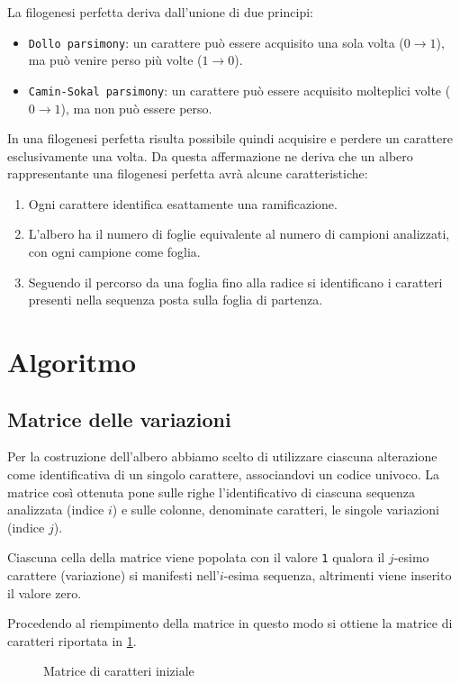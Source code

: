 \documentclass[11pt,italian]{article}
\begin{document}
\noindent
La filogenesi perfetta deriva dall'unione di due principi:
\begin{itemize}
	\item \lstinline{Dollo parsimony}: un carattere può essere acquisito una sola volta ($0 \to 1$), ma può venire perso più volte ($1 \to 0$).
	\item \lstinline{Camin-Sokal parsimony}: un carattere può essere acquisito molteplici volte ($0 \to 1$), ma non può essere perso.
\end{itemize}
In una filogenesi perfetta risulta possibile quindi acquisire e perdere un carattere esclusivamente una volta.
Da questa affermazione ne deriva che un albero rappresentante una filogenesi perfetta avrà alcune caratteristiche:
\begin{enumerate}
	\item Ogni carattere identifica esattamente una ramificazione.
	\item L'albero ha il numero di foglie equivalente al numero di campioni analizzati, con ogni campione come foglia.
	\item Seguendo il percorso da una foglia fino alla radice si identificano i caratteri presenti nella sequenza posta sulla foglia di partenza.
\end{enumerate}

\newpage
\section{Algoritmo}
\subsection{Matrice delle variazioni}
Per la costruzione dell'albero abbiamo scelto di utilizzare ciascuna alterazione come identificativa di un singolo carattere, associandovi un codice univoco.
La matrice così ottenuta pone sulle righe l'identificativo di ciascuna sequenza analizzata (indice $i$) e sulle colonne, denominate caratteri, le singole variazioni (indice $j$).

Ciascuna cella della matrice viene popolata con il valore \lstinline{1} qualora il $j$-esimo carattere (variazione) si manifesti nell'$i$-esima sequenza, altrimenti viene inserito il valore zero.

Procedendo al riempimento della matrice in questo modo si ottiene la matrice di caratteri riportata in \cref{fig:matrix-characters}.

\begin{figure}[H]
  \caption{Matrice di caratteri iniziale}
  \label{fig:matrix-characters}
\end{figure}
\end{document}
